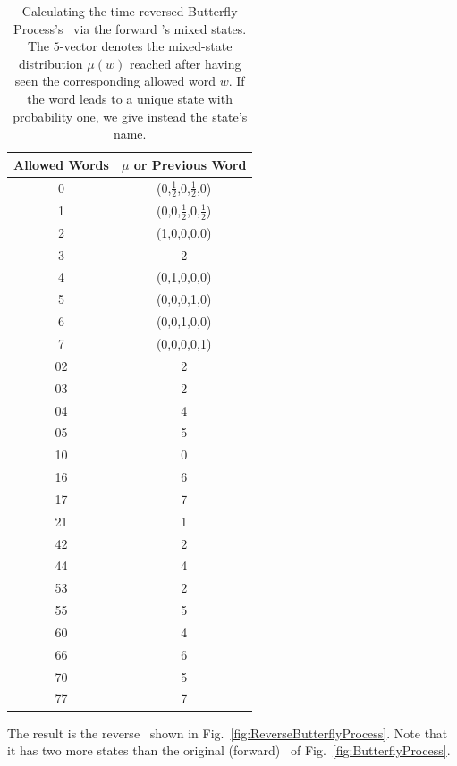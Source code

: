 \documentclass[prl,twocolumn,showpacs,superscriptaddress,preprintnumbers,floatfix]{revtex4}
\theoremstyle{plain}   \newtheorem{Lem}{Lemma}
\theoremstyle{plain} 	\newtheorem{Cor}{Corollary}
\theoremstyle{plain} 	\newtheorem{The}{Theorem}
\theoremstyle{plain} 	\newtheorem{Prop}{Proposition}
\theoremstyle{plain} 	\newtheorem*{Conj}{Conjecture}
\theoremstyle{plain}	\newtheorem*{Rem}{Remark}
\theoremstyle{plain}	\newtheorem*{Def}{Definition}
\theoremstyle{plain}	\newtheorem*{Not}{Notation}
\begin{document}
\begin{table}[th]
\begin{center}
\begin{tabular}{|c|c|}
\hline
Allowed Words & $\mu$ or Previous Word\\
\hline
0 & (0,$\frac{1}{2}$,0,$\frac{1}{2}$,0)\\
1 & (0,0,$\frac{1}{2}$,0,$\frac{1}{2}$)\\
2 & (1,0,0,0,0)\\
3 & 2\\
4 & (0,1,0,0,0)\\
5 & (0,0,0,1,0)\\
6 & (0,0,1,0,0)\\
7 & (0,0,0,0,1)\\
02 & 2\\
03 & 2\\
04 & 4\\
05 & 5\\
10 & 0\\
16 & 6\\
17 & 7\\
21 & 1\\
42 & 2\\
44 & 4\\
53 & 2\\
55 & 5\\
60 & 4\\
66 & 6\\
70 & 5\\
77 & 7\\
\hline
\end{tabular}
\end{center}
\caption{Calculating the time-reversed Butterfly Process's \eM\ via the forward
  \eM's mixed states. The $5$-vector denotes the mixed-state distribution
  $\mu(w)$ reached after having seen the corresponding allowed word $w$. If
  the word leads to a unique state with probability one, we give instead the
  state's name.
  }
\label{tab:ButterflyProcessMixedStates}
\end{table}

The result is the reverse \eM\ shown in Fig.~\ref{fig:ReverseButterflyProcess}.
Note that it has two more states than the original (forward) \eM\ of
Fig.~\ref{fig:ButterflyProcess}.
\end{document}
